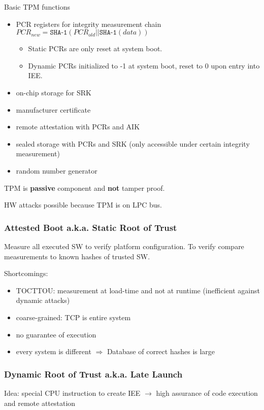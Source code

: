 Basic TPM functions
\begin{itemize}
    \item PCR registers for integrity measurement chain $PCR_{new} = \texttt{SHA-1}(PCR_{old}|| \texttt{SHA-1}(data))$
      \begin{itemize}
	\item Static PCRs are only reset at system boot.
	\item Dynamic PCRs initialized to -1 at system boot, reset to 0 upon entry into IEE.
      \end{itemize}

    \item on-chip storage for SRK
    \item manufacturer certificate
    \item remote attestation with PCRs and AIK
    \item sealed storage with PCRs and SRK (only accessible under certain integrity measurement)
    \item random number generator
\end{itemize}
TPM is \textbf{passive} component and \textbf{not} tamper proof.

HW attacks possible because TPM is on LPC bus.

\subsubsection{Attested Boot a.k.a. Static Root of Trust}
Measure all executed SW to verify platform configuration. To verify compare measurements to known hashes of trusted SW.

Shortcomings:

\begin{itemize}
    \item TOCTTOU: measurement at load-time and not at runtime (inefficient against dynamic attacks)
    \item coarse-grained: TCP is entire system
    \item no guarantee of execution
    \item every system is different $\Rightarrow$ Database of correct hashes is
      large
\end{itemize}

\subsubsection{Dynamic Root of Trust a.k.a. Late Launch}
Idea: special CPU instruction to create IEE $\xrightarrow{}$ high assurance of code execution and remote attestation

